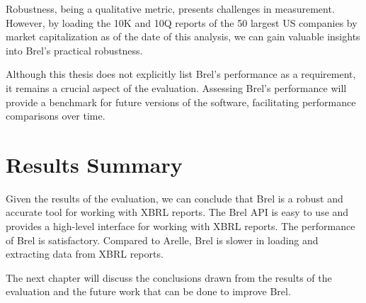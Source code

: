 Robustness, being a qualitative metric, presents challenges in measurement. 
However, by loading the 10K and 10Q reports of the 50 largest US companies by market capitalization as of the date of this analysis, 
we can gain valuable insights into Brel's practical robustness.

Although this thesis does not explicitly list Brel's performance as a requirement, 
it remains a crucial aspect of the evaluation. 
Assessing Brel's performance will provide a benchmark for future versions of the software, 
facilitating performance comparisons over time.









\section{Results Summary}
Given the results of the evaluation, we can conclude that Brel is a robust and accurate tool for working with XBRL reports.
The Brel API is easy to use and provides a high-level interface for working with XBRL reports.
The performance of Brel is satisfactory.
Compared to Arelle, Brel is slower in loading and extracting data from XBRL reports.

The next chapter will discuss the conclusions drawn from the results of the evaluation and the future work that can be done to improve Brel.
